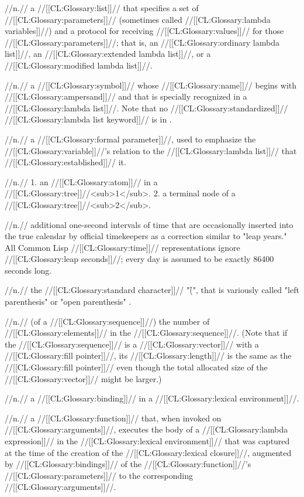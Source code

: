  //n.// a //[[CL:Glossary:list]]// that specifies a set of //[[CL:Glossary:parameters]]// (sometimes called //[[CL:Glossary:lambda variables]]//) and a protocol for receiving //[[CL:Glossary:values]]// for those //[[CL:Glossary:parameters]]//; that is, an //[[CL:Glossary:ordinary lambda list]]//, an //[[CL:Glossary:extended lambda list]]//, or a //[[CL:Glossary:modified lambda list]]//.

 //n.// a //[[CL:Glossary:symbol]]// whose //[[CL:Glossary:name]]// begins with //[[CL:Glossary:ampersand]]// and that is specially recognized in a //[[CL:Glossary:lambda list]]//. Note that no //[[CL:Glossary:standardized]]// //[[CL:Glossary:lambda list keyword]]// is in .
 
 //n.// a //[[CL:Glossary:formal parameter]]//, used to emphasize the //[[CL:Glossary:variable]]//'s relation to the //[[CL:Glossary:lambda list]]// that //[[CL:Glossary:established]]// it.
 
 //n.// 1. an //[[CL:Glossary:atom]]// in a //[[CL:Glossary:tree]]//<sub>1</sub>. 2. a terminal node of a //[[CL:Glossary:tree]]//<sub>2</sub>.
 
 //n.// additional one-second intervals of time that are occasionally inserted into the true calendar by official timekeepers as a correction similar to "leap years." All Common Lisp //[[CL:Glossary:time]]// representations ignore //[[CL:Glossary:leap seconds]]//; every day is assumed to be exactly 86400 seconds long.

 //n.// the //[[CL:Glossary:standard character]]// "\f{(}", that is variously called "left parenthesis" or "open parenthesis" \Seefigure\StdCharsThree.

 //n.// (of a //[[CL:Glossary:sequence]]//) the number of //[[CL:Glossary:elements]]// in the //[[CL:Glossary:sequence]]//. (Note that if the //[[CL:Glossary:sequence]]// is a //[[CL:Glossary:vector]]// with a //[[CL:Glossary:fill pointer]]//, its //[[CL:Glossary:length]]// is the same as the //[[CL:Glossary:fill pointer]]// even though the total allocated size of the //[[CL:Glossary:vector]]// might be larger.)

 //n.// a //[[CL:Glossary:binding]]// in a //[[CL:Glossary:lexical environment]]//.

 //n.// a //[[CL:Glossary:function]]// that, when invoked on //[[CL:Glossary:arguments]]//, executes the body of a //[[CL:Glossary:lambda expression]]// in the //[[CL:Glossary:lexical environment]]// that was captured at the time of the creation of the //[[CL:Glossary:lexical closure]]//, augmented by //[[CL:Glossary:bindings]]// of the //[[CL:Glossary:function]]//'s //[[CL:Glossary:parameters]]// to the corresponding //[[CL:Glossary:arguments]]//.
 
